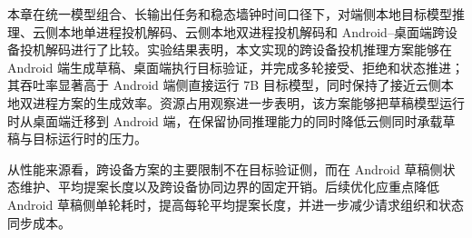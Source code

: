 本章在统一模型组合、长输出任务和稳态墙钟时间口径下，对端侧本地目标模型推理、云侧本地单进程投机解码、云侧本地双进程投机解码和 Android--桌面端跨设备投机解码进行了比较。实验结果表明，本文实现的跨设备投机推理方案能够在 Android 端生成草稿、桌面端执行目标验证，并完成多轮接受、拒绝和状态推进；其吞吐率显著高于 Android 端侧直接运行 7B 目标模型，同时保持了接近云侧本地双进程方案的生成效率。资源占用观察进一步表明，该方案能够把草稿模型运行时从桌面端迁移到 Android 端，在保留协同推理能力的同时降低云侧同时承载草稿与目标运行时的压力。

从性能来源看，跨设备方案的主要限制不在目标验证侧，而在 Android 草稿侧状态维护、平均提案长度以及跨设备协同边界的固定开销。后续优化应重点降低 Android 草稿侧单轮耗时，提高每轮平均提案长度，并进一步减少请求组织和状态同步成本。
